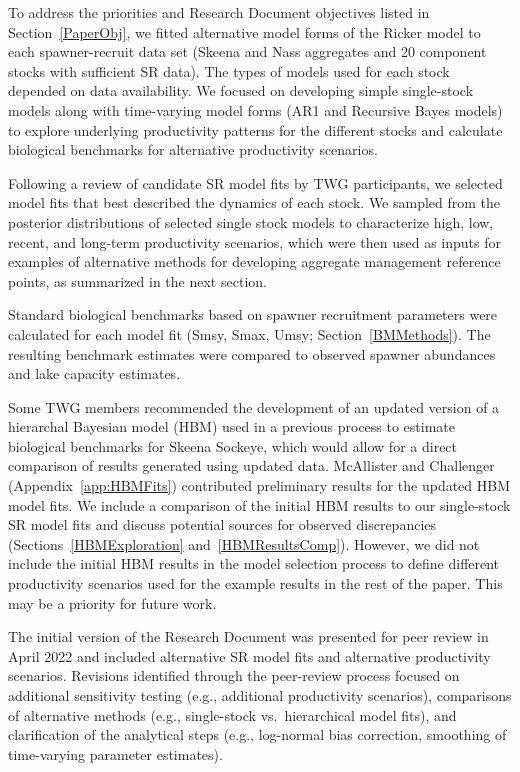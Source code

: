 \documentclass[french,11pt]{book}
\begin{document}
To address the priorities and Research Document objectives listed in Section~\ref{PaperObj}, we fitted alternative model forms of the Ricker model to each spawner-recruit data set (Skeena and Nass aggregates and 20 component stocks with sufficient SR data). The types of models used for each stock depended on data availability. We focused on developing simple single-stock models along with time-varying model forms (AR1 and Recursive Bayes models) to explore underlying productivity patterns for the different stocks and calculate biological benchmarks for alternative productivity scenarios.

Following a review of candidate SR model fits by TWG participants, we selected model fits that best described the dynamics of each stock. We sampled from the posterior distributions of selected single stock models to characterize high, low, recent, and long-term productivity scenarios, which were then used as inputs for examples of alternative methods for developing aggregate management reference points, as summarized in the next section.

Standard biological benchmarks based on spawner recruitment parameters were calculated for each model fit (Smsy, Smax, Umsy; Section~\ref{BMMethods}). The resulting benchmark estimates were compared to observed spawner abundances and lake capacity estimates.

Some TWG members recommended the development of an updated version of a hierarchal Bayesian model (HBM) used in a previous process to estimate biological benchmarks for Skeena Sockeye, which would allow for a direct comparison of results generated using updated data. McAllister and Challenger (Appendix~\ref{app:HBMFits}) contributed preliminary results for the updated HBM model fits. We include a comparison of the initial HBM results to our single-stock SR model fits and discuss potential sources for observed discrepancies (Sections~\ref{HBMExploration} and~\ref{HBMResultsComp}). However, we did not include the initial HBM results in the model selection process to define different productivity scenarios used for the example results in the rest of the paper. This may be a priority for future work.

The initial version of the Research Document was presented for peer review in April 2022 and included alternative SR model fits and alternative productivity scenarios. Revisions identified through the peer-review process focused on additional sensitivity testing (e.g., additional productivity scenarios), comparisons of alternative methods (e.g., single-stock vs.~hierarchical model fits), and clarification of the analytical steps (e.g., log-normal bias correction, smoothing of time-varying parameter estimates).
\end{document}
